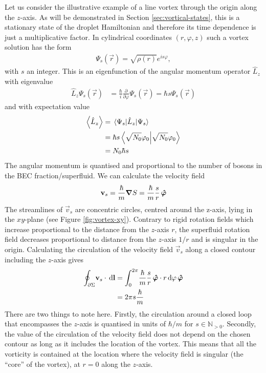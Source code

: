 			Let us consider the illustrative example of a line vortex through the origin along the $z$-axis. As will be demonstrated in Section \ref{sec:vortical-states}, this is a stationary state of the droplet Hamiltonian and therefore its time dependence is just a multiplicative factor. In cylindrical coordinates $(r,\varphi,z)$ such a vortex solution has the form
			\begin{align}
				\Psi_s(\vec{r}) = \sqrt{\rho(r)}\unit{e}^{is\varphi}, \label{eq:line-vortex}
			\end{align}
			with $s$ an integer. This is an eigenfunction of the angular momentum operator $\hat{L}_z$ with eigenvalue
			\begin{align}
				\hat{L}_z \Psi_s(\vec{r}) &= \frac{\hbar}{i}\frac{\partial}{\partial\varphi}\Psi_s(\vec{r}) = \hbar s\Psi_s(\vec{r})
			\end{align}
			and with expectation value
			\begin{align}
				\expval{\hat{L}_z} &= \expval{\hat{L}_z}{\Psi_s} \\
					&= \hbar s \braket{\sqrt{N_0}\varphi_0} \\
					&= N_0\hbar s
			\end{align}
			The angular momentum is quantised and proportional to the number of bosons in the BEC fraction/superfluid. We can calculate the velocity field
			\begin{align}
				\bm{\mathrm{v}}_s = \frac{\hbar}{m}\grad{S} = \frac{\hbar}{m}\frac{s}{r}\,\vu*{\varphi}
			\end{align}
			The streamlines of $\vec{v}_s$ are concentric circles, centred around the z-axis, lying in the $xy$-plane (see Figure \ref{fig:vortex-xy}). Contrary to rigid rotation fields which increase proportional to the distance from the $z$-axis $r$, the superfluid rotation field decreases proportional to distance from the $z$-axis $1/r$ and is singular in the origin. Calculating the circulation of the velocity field $\vec{v}_s$ along a closed contour including the $z$-axis gives
			\begin{align}
				\oint_{\partial\Sigma}\!\bm{\mathrm{v}}_s\cdot\,\mathrm{d}\bm{\mathrm{l}} &=
				\int_{0}^{2\pi}\!\frac{\hbar}{m}\frac{s}{r}\,\vu*{\varphi}\cdot r\,\mathrm{d}\varphi\,\vu*{\varphi} \\
					&= 2\pi s\frac{\hbar}{m}
			\end{align}
			There are two things to note here. Firstly, the circulation around a closed loop that encompasses the $z$-axis is quantised in units of $\hbar/m$ for $s\in\mathbb{N}_{>0}$. Secondly, the value of the circulation of the velocity field does not depend on the chosen contour as long as it includes the location of the vortex. This means that all the vorticity is contained at the location where the velocity field is singular (the ``core'' of the vortex), at $r=0$ along the $z$-axis.\\
			
